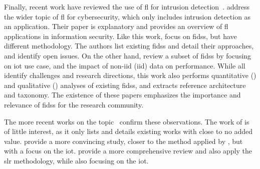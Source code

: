 Finally, recent work have reviewed the use of \gls{fl} for intrusion
detection~\cite{agrawal_FederatedLearningIntrusion_2021,campos_EvaluatingFederatedLearning_2022,alazab_FederatedLearningCybersecurity_2021}.
\textcite{alazab_FederatedLearningCybersecurity_2021} address the wider topic of
\gls{fl} for cybersecurity, which only includes intrusion detection as an application.
Their paper
is explanatory and provides an overview of \gls{fl} applications in information security.
Like this
work, \textcite{agrawal_FederatedLearningIntrusion_2021} focus on \glspl{fids}, but have different methodology.
The authors list
existing \glspl{fids} and detail their approaches, and identify open issues.
On the other hand,
\textcite{campos_EvaluatingFederatedLearning_2022} review a subset of \glspl{fids} by focusing on \gls{iot} use case, and the
impact of non-\acrshort{iid} (\acrlong{iid}) data on performance.
While all identify challenges and
research directions, this work also performs quantitative () and
qualitative () analyses of existing \glspl{fids}, and extracts reference
architecture and taxonomy.
The existence of these papers emphasizes the importance and relevance of
\glspl{fids} for the research community.

The more recent works on the topic~\cite{fedorchenko_ComparativeReviewIntrusion_2022, ghimire_RecentAdvancesFederated_2022, ismaila_ReviewApproachesFederated_2024} confirm these observations.
The work of \citeauthor{fedorchenko_ComparativeReviewIntrusion_2022} is of little interest, as it only lists and details existing works with close to no added value.
\textcite{ghimire_RecentAdvancesFederated_2022} provide a more convincing study, closer to the method applied by \textcite{alazab_FederatedLearningCybersecurity_2021}, but with a focus on the \gls{iot}.
\textcite{ismaila_ReviewApproachesFederated_2024} provide a more comprehensive review and also apply the \gls{slr} methodology, while also focusing on the \gls{iot}.
